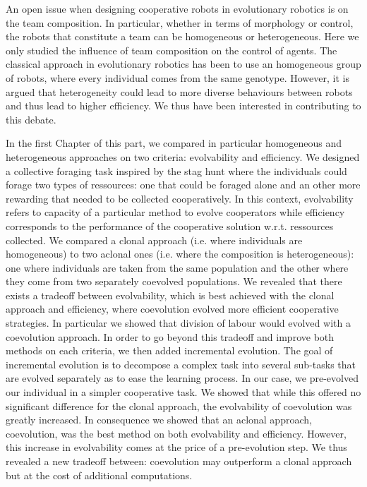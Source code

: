 		An open issue when designing cooperative robots in evolutionary robotics is on the team composition. In particular, whether in terms of morphology or control, the robots that constitute a team can be homogeneous or heterogeneous. Here we only studied the influence of team composition on the control of agents. The classical approach in evolutionary robotics has been to use an homogeneous group of robots, where every individual comes from the same genotype. However, it is argued that heterogeneity could lead to more diverse behaviours between robots and thus lead to higher efficiency. We thus have been interested in contributing to this debate.

		In the first Chapter of this part, we compared in particular homogeneous and heterogeneous approaches on two criteria: evolvability and efficiency. We designed a collective foraging task inspired by the stag hunt where the individuals could forage two types of ressources: one that could be foraged alone and an other more rewarding that needed to be collected cooperatively. In this context, evolvability refers to capacity of a particular method to evolve cooperators while efficiency corresponds to the performance of the cooperative solution w.r.t. ressources collected. We compared a clonal approach (i.e. where individuals are homogeneous) to two aclonal ones (i.e. where the composition is heterogeneous): one where individuals are taken from the same population and the other where they come from two separately coevolved populations. We revealed that there exists a tradeoff between evolvability, which is best achieved with the clonal approach and efficiency, where coevolution evolved more efficient cooperative strategies. In particular we showed that division of labour would evolved with a coevolution approach. In order to go beyond this tradeoff and improve both methods on each criteria, we then added incremental evolution. The goal of incremental evolution is to decompose a complex task into several sub-tasks that are evolved separately as to ease the learning process. In our case, we pre-evolved our individual in a simpler cooperative task. We showed that while this offered no significant difference for the clonal approach, the evolvability of coevolution was greatly increased. In consequence we showed that an aclonal approach, coevolution, was the best method on both evolvability and efficiency. However, this increase in evolvability comes at the price of a pre-evolution step. We thus revealed a new tradeoff between: coevolution may outperform a clonal approach but at the cost of additional computations.

